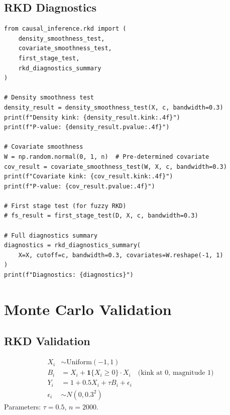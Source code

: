 \subsection{RKD Diagnostics}

\begin{verbatim}
from causal_inference.rkd import (
    density_smoothness_test,
    covariate_smoothness_test,
    first_stage_test,
    rkd_diagnostics_summary
)

# Density smoothness test
density_result = density_smoothness_test(X, c, bandwidth=0.3)
print(f"Density kink: {density_result.kink:.4f}")
print(f"P-value: {density_result.pvalue:.4f}")

# Covariate smoothness
W = np.random.normal(0, 1, n)  # Pre-determined covariate
cov_result = covariate_smoothness_test(W, X, c, bandwidth=0.3)
print(f"Covariate kink: {cov_result.kink:.4f}")
print(f"P-value: {cov_result.pvalue:.4f}")

# First stage test (for fuzzy RKD)
# fs_result = first_stage_test(D, X, c, bandwidth=0.3)

# Full diagnostics summary
diagnostics = rkd_diagnostics_summary(
    X=X, cutoff=c, bandwidth=0.3, covariates=W.reshape(-1, 1)
)
print(f"Diagnostics: {diagnostics}")
\end{verbatim}

\section{Monte Carlo Validation}
\label{sec:kink_validation}

\subsection{RKD Validation}

\begin{definition}
\begin{align}
    X_i &\sim \text{Uniform}(-1, 1) \\
    B_i &= X_i + \mathbf{1}\{X_i \geq 0\} \cdot X_i \quad \text{(kink at 0, magnitude 1)} \\
    Y_i &= 1 + 0.5 X_i + \tau B_i + \epsilon_i \\
    \epsilon_i &\sim N(0, 0.3^2)
\end{align}
Parameters: $\tau = 0.5$, $n = 2000$.
\end{definition}

